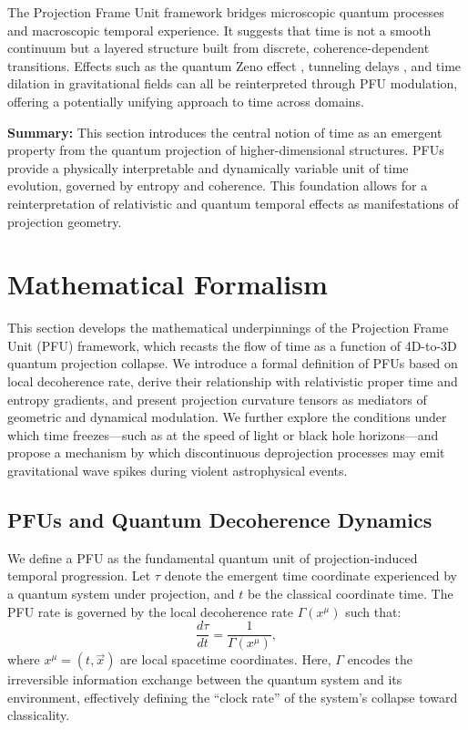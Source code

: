 \documentclass[12pt,a4paper]{article}
\numberwithin{equation}{section}
\begin{document}
The Projection Frame Unit framework bridges microscopic quantum processes and macroscopic temporal experience. It suggests that time is not a smooth continuum but a layered structure built from discrete, coherence-dependent transitions. Effects such as the quantum Zeno effect \cite{misra_zeno_1977}, tunneling delays \cite{winful_delay_2006}, and time dilation in gravitational fields \cite{schutz_gravitation_2009} can all be reinterpreted through PFU modulation, offering a potentially unifying approach to time across domains.

\vspace{0.5cm}

\noindent\textbf{Summary:} This section introduces the central notion of time as an emergent property from the quantum projection of higher-dimensional structures. PFUs provide a physically interpretable and dynamically variable unit of time evolution, governed by entropy and coherence. This foundation allows for a reinterpretation of relativistic and quantum temporal effects as manifestations of projection geometry.



\section{Mathematical Formalism}
\label{sec:math}

This section develops the mathematical underpinnings of the Projection Frame Unit (PFU) framework, which recasts the flow of time as a function of 4D-to-3D quantum projection collapse. We introduce a formal definition of PFUs based on local decoherence rate, derive their relationship with relativistic proper time and entropy gradients, and present projection curvature tensors as mediators of geometric and dynamical modulation. We further explore the conditions under which time freezes—such as at the speed of light or black hole horizons—and propose a mechanism by which discontinuous deprojection processes may emit gravitational wave spikes during violent astrophysical events.

\subsection{PFUs and Quantum Decoherence Dynamics}

We define a PFU as the fundamental quantum unit of projection-induced temporal progression. Let $\tau$ denote the emergent time coordinate experienced by a quantum system under projection, and $t$ be the classical coordinate time. The PFU rate is governed by the local decoherence rate $\Gamma(x^\mu)$ such that:
\begin{equation}
\label{eq:pfu_rate}
\frac{d\tau}{dt} = \frac{1}{\Gamma(x^\mu)},
\end{equation}
where $x^\mu = (t, \vec{x})$ are local spacetime coordinates. Here, $\Gamma$ encodes the irreversible information exchange between the quantum system and its environment, effectively defining the “clock rate” of the system’s collapse toward classicality.
\end{document}
